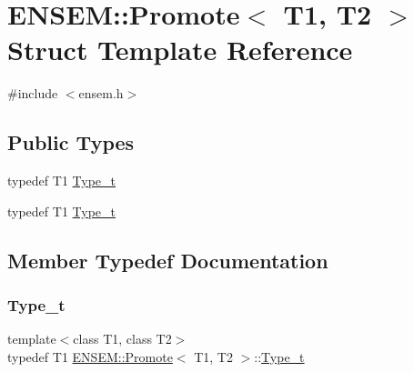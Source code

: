 \hypertarget{structENSEM_1_1Promote}{}\section{E\+N\+S\+EM\+:\+:Promote$<$ T1, T2 $>$ Struct Template Reference}
\label{structENSEM_1_1Promote}


{\ttfamily \#include $<$ensem.\+h$>$}

\subsection*{Public Types}
\begin{DoxyCompactItemize}
\item 
typedef T1 \mbox{\hyperlink{structENSEM_1_1Promote_a6a7260634b484365b9d70ccf3c0fd6fd}{Type\+\_\+t}}
\item 
typedef T1 \mbox{\hyperlink{structENSEM_1_1Promote_a6a7260634b484365b9d70ccf3c0fd6fd}{Type\+\_\+t}}
\end{DoxyCompactItemize}


\subsection{Member Typedef Documentation}
\mbox{\label{structENSEM_1_1Promote_a6a7260634b484365b9d70ccf3c0fd6fd}} 
\subsubsection{\texorpdfstring{Type\_t}{Type\_t}\hspace{0.1cm}{\footnotesize\ttfamily [1/2]}}
{\footnotesize\ttfamily template$<$class T1, class T2$>$ \\
typedef T1 \mbox{\hyperlink{structENSEM_1_1Promote}{E\+N\+S\+E\+M\+::\+Promote}}$<$ T1, T2 $>$\+::\mbox{\hyperlink{structENSEM_1_1Promote_a6a7260634b484365b9d70ccf3c0fd6fd}{Type\+\_\+t}}}

\mbox{\label{structENSEM_1_1Promote_a6a7260634b484365b9d70ccf3c0fd6fd}} 
